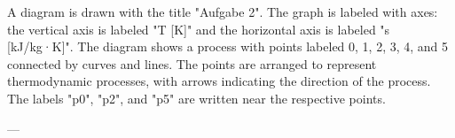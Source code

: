 A diagram is drawn with the title "Aufgabe 2". The graph is labeled with axes: the vertical axis is labeled "T [K]" and the horizontal axis is labeled "s [kJ/kg·K]". The diagram shows a process with points labeled 0, 1, 2, 3, 4, and 5 connected by curves and lines. The points are arranged to represent thermodynamic processes, with arrows indicating the direction of the process. The labels "p0", "p2", and "p5" are written near the respective points.

---
